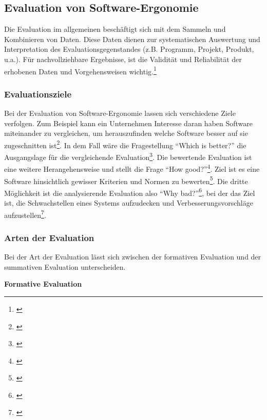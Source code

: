 
\subsection{Evaluation von Software-Ergonomie}
Die Evaluation im allgemeinen beschäftigt sich mit dem Sammeln und Kombinieren von Daten. Diese Daten dienen zur systematischen Auswertung und Interpretation des Evaluationsgegenstandes (z.B. Programm, Projekt, Produkt, u.a.). Für nachvollziehbare Ergebnisse, ist die Validität und Reliabilität der erhobenen Daten und Vorgehensweisen wichtig.\footnote{\cite[vgl.][7]{Hegner2003}}


\subsubsection{Evaluationsziele}

Bei der Evaluation von Software-Ergonomie lassen sich verschiedene Ziele verfolgen. Zum Beispiel kann ein Unternehmen Interesse daran haben Software miteinander zu vergleichen, um herauszufinden welche Software besser auf sie zugeschnitten ist\footnote{\cite[vgl.][]{Gediga2002evaluation}}. In dem Fall wäre die Fragestellung \enquote{Which is better?} die Ausgangslage für die vergleichende Evaluation\footnote{\cite[vgl.][9]{Hegner2003}}. Die bewertende Evaluation ist eine weitere Herangehensweise und stellt die Frage \enquote{How good?}\footnote{\cite[vgl.][9]{Hegner2003}}. Ziel ist es eine Software hinsichtlich gewisser Kriterien und Normen zu bewerten\footnote{\cite[vgl.][]{Gediga2002evaluation}}. Die dritte Möglichkeit ist die analysierende Evaluation also \enquote{Why bad?}\footnote{\cite[vgl.][9]{Hegner2003}}, bei der das Ziel ist, die Schwachstellen eines Systems aufzudecken und Verbesserungsvorschläge aufzustellen\footnote{\cite[vgl.][]{Gediga2002evaluation}}.


\subsubsection{Arten der Evaluation}
Bei der Art der Evaluation lässt sich zwischen der formativen Evaluation und der summativen Evaluation unterscheiden.

\textbf{Formative Evaluation}

